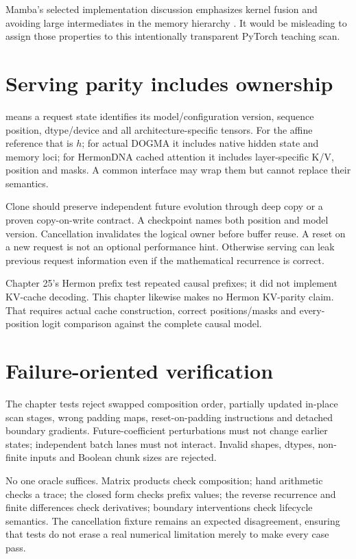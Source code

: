 Mamba's selected implementation discussion emphasizes kernel fusion and avoiding
large intermediates in the memory hierarchy \cite{GuDao2024}. It would be misleading
to assign those properties to this intentionally transparent PyTorch teaching scan.

\section{Serving parity includes ownership}
 means a request state identifies its model/configuration version, sequence position,
dtype/device and all architecture-specific tensors. For the affine reference that
is $h$; for actual DOGMA it includes native hidden state and memory loci; for
HermonDNA cached attention it includes layer-specific K/V, position and masks.
A common interface may wrap them but cannot replace their semantics.

Clone should preserve independent future evolution through deep copy or a proven
copy-on-write contract. A checkpoint names both position and model version.
Cancellation invalidates the logical owner before buffer reuse. A reset on a new
request is not an optional performance hint. Otherwise serving can leak previous
request information even if the mathematical recurrence is correct.

Chapter 25's Hermon prefix test repeated causal prefixes; it did not implement
KV-cache decoding. This chapter likewise makes no Hermon KV-parity claim.
That requires actual cache construction, correct positions/masks and every-position
logit comparison against the complete causal model.

\section{Failure-oriented verification}
The chapter tests reject swapped composition order, partially updated in-place
scan stages, wrong padding maps, reset-on-padding instructions and detached
boundary gradients. Future-coefficient perturbations must not change earlier
states; independent batch lanes must not interact. Invalid shapes, dtypes,
non-finite inputs and Boolean chunk sizes are rejected.

No one oracle suffices. Matrix products check composition; hand arithmetic checks
a trace; the closed form checks prefix values; the reverse recurrence and finite
differences check derivatives; boundary interventions check lifecycle semantics.
The cancellation fixture remains an expected disagreement, ensuring that tests
do not erase a real numerical limitation merely to make every case pass.

